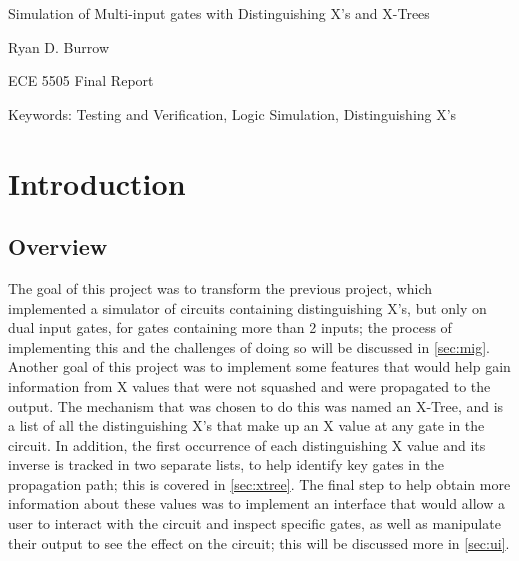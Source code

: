 \documentclass[12pt]{report}
\def \doctitle {Simulation of Multi-input gates with Distinguishing X’s and X-Trees}
\begin{document}
\thispagestyle{empty}
\begin{center}

{\Large 
\doctitle
}

\vfill

Ryan D. Burrow

\vfill

ECE 5505 Final Report

\vfill

\date{\today}

\vfill

Keywords: Testing and Verification, Logic Simulation, Distinguishing X's\\

\end{center}

\pagebreak


\tableofcontents
\pagebreak

\listoffigures

%

\printacronyms[include-classes=acron,name=List of Acronyms]
\pagebreak

\pagestyle{myheadings}

\doublespacing

\acresetall

\chapter{Introduction} \label{introduction}

\section{Overview}

The goal of this project was to transform the previous project, which implemented a simulator of circuits containing distinguishing X’s, but only on dual input gates, for gates containing more than 2 inputs; the process of implementing this and the challenges of doing so will be discussed in \cref{sec:mig}. Another goal of this project was to implement some features that would help gain information from X values that were not squashed and were propagated to the output. The mechanism that was chosen to do this was named an X-Tree, and is a list of all the distinguishing X’s that make up an X value at any gate in the circuit. In addition, the first occurrence of each distinguishing X value and its inverse is tracked in two separate lists, to help identify key gates in the propagation path; this is covered in \cref{sec:xtree}. The final step to help obtain more information about these values was to implement an interface that would allow a user to interact with the circuit and inspect specific gates, as well as manipulate their output to see the effect on the circuit; this will be discussed more in \cref{sec:ui}.
\end{document}
